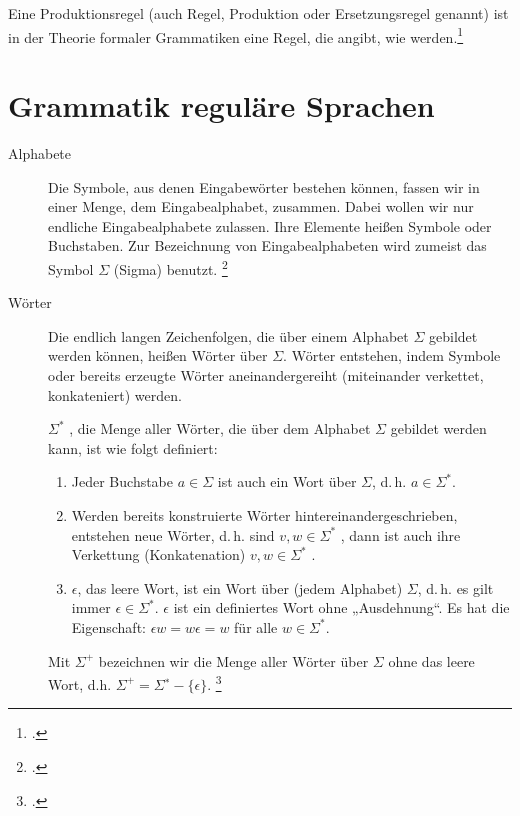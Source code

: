 \documentclass{lehramt-informatik-haupt}
\begin{document}
Eine Produktionsregel (auch Regel, Produktion oder Ersetzungsregel
genannt) ist in der Theorie formaler Grammatiken eine Regel, die angibt,
wie  werden.\footcite{wiki:produktionsregel}

%

\section{Grammatik reguläre Sprachen}

\begin{description}
\item[Alphabete]

Die Symbole, aus denen Eingabewörter bestehen können, fassen wir in
einer Menge, dem Eingabealphabet, zusammen. Dabei wollen wir nur
endliche Eingabealphabete zulassen. Ihre Elemente heißen Symbole oder
Buchstaben. Zur Bezeichnung von Eingabealphabeten wird zumeist das
Symbol $\Sigma$ (Sigma) benutzt.
\footcite[Seite 15]{vossen}

\item[Wörter]
Die endlich langen Zeichenfolgen, die über einem Alphabet $\Sigma$
gebildet werden können, heißen Wörter über $\Sigma$. Wörter entstehen,
indem Symbole oder bereits erzeugte Wörter aneinandergereiht
(miteinander verkettet, konkateniert) werden.

$\Sigma^*$ , die Menge aller Wörter, die über dem Alphabet $\Sigma$
gebildet werden kann, ist wie folgt definiert:

\begin{enumerate}
\item Jeder Buchstabe $a \in \Sigma$ ist auch ein Wort über $\Sigma$,
d.\,h. $a \in \Sigma^*$.

\item Werden bereits konstruierte Wörter hintereinandergeschrieben,
entstehen neue Wörter, d.\,h. sind $v, w \in Σ^*$ , dann ist auch ihre
Verkettung (Konkatenation) $v, w \in Σ^*$ .

\item $\epsilon$, das leere Wort, ist ein Wort über (jedem Alphabet)
$\Sigma$, d.\,h. es gilt immer $\epsilon \in Σ^*$. $\epsilon$ ist ein
definiertes Wort ohne „Ausdehnung“. Es hat die Eigenschaft: $\epsilon w
= w \epsilon = w$ für alle $w \in Σ^*$.
\end{enumerate}

Mit $\Sigma^+$ bezeichnen wir die Menge aller Wörter über $\Sigma$ ohne
das leere Wort, d.h. $\Sigma^+ = \Sigma^∗ - \{ \epsilon \}$.
\footcite[Seite 16]{vossen}
\end{description}
\end{document}

